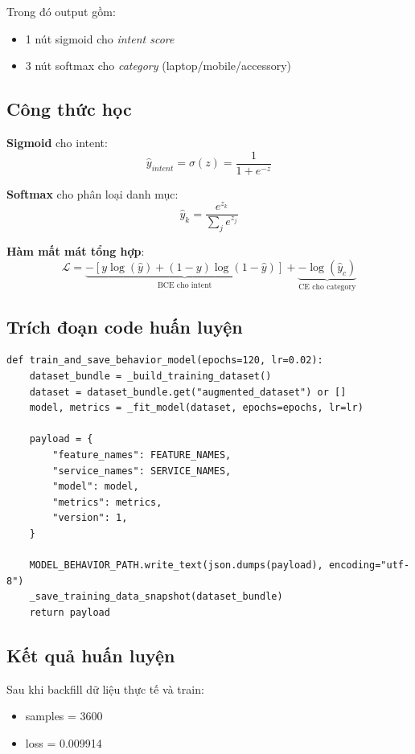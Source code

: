 \documentclass[12pt,a4paper]{article}
\begin{document}
Trong đó output gồm:
\begin{itemize}
  \item 1 nút sigmoid cho \textit{intent score}
  \item 3 nút softmax cho \textit{category} (laptop/mobile/accessory)
\end{itemize}

\subsection{Công thức học}
\textbf{Sigmoid} cho intent:
\[
\hat{y}_{intent} = \sigma(z) = \frac{1}{1 + e^{-z}}
\]

\textbf{Softmax} cho phân loại danh mục:
\[
\hat{y}_k = \frac{e^{z_k}}{\sum_j e^{z_j}}
\]

\textbf{Hàm mất mát tổng hợp}:
\[
\mathcal{L} = \underbrace{-\left[y\log(\hat{y}) + (1-y)\log(1-\hat{y})\right]}_{\text{BCE cho intent}} +
\underbrace{-\log(\hat{y}_{c})}_{\text{CE cho category}}
\]

\subsection{Trích đoạn code huấn luyện}
\begin{lstlisting}[style=pythonstyle,caption={Train model\_behavior và lưu artifact},label={lst:train-behavior}]
def train_and_save_behavior_model(epochs=120, lr=0.02):
    dataset_bundle = _build_training_dataset()
    dataset = dataset_bundle.get("augmented_dataset") or []
    model, metrics = _fit_model(dataset, epochs=epochs, lr=lr)

    payload = {
        "feature_names": FEATURE_NAMES,
        "service_names": SERVICE_NAMES,
        "model": model,
        "metrics": metrics,
        "version": 1,
    }

    MODEL_BEHAVIOR_PATH.write_text(json.dumps(payload), encoding="utf-8")
    _save_training_data_snapshot(dataset_bundle)
    return payload
\end{lstlisting}

\subsection{Kết quả huấn luyện}
Sau khi backfill dữ liệu thực tế và train:
\begin{itemize}
  \item samples = 3600
  \item loss = 0.009914
\end{itemize}
\end{document}
